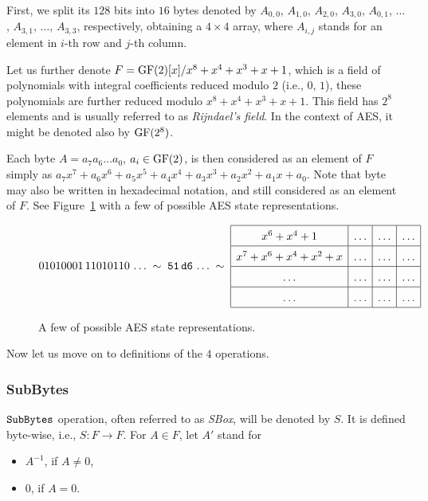 First, we split its $128$ bits into $16$ bytes denoted by $A_{0,0}$, $A_{1,0}$, $A_{2,0}$, $A_{3,0}$, $A_{0,1}$, $\ldots$, $A_{3,1}$, $\ldots$, $A_{3,3}$, respectively, obtaining a $4\times 4$ array, where $A_{i,j}$ stands for an element in $i$-th row and $j$-th column.

Let us further denote $F = \mathrm{GF}(2)[x]/x^8+x^4+x^3+x+1$, which is a field of polynomials with integral coefficients reduced modulo $2$ (i.e., $0$, $1$), these polynomials are further reduced modulo $x^8+x^4+x^3+x+1$. This field has $2^8$ elements and is usually referred to as {\em Rijndael's field}. In the context of AES, it might be denoted also by $\mathrm{GF}(2^8)$.


Each byte $A = a_7a_6\ldots a_0$, $a_i\in\mathrm{GF}(2)$, is then considered as an element of $F$ simply as $a_7x^7 + a_6x^6 + a_5x^5 + a_4x^4 + a_3x^3 + a_2x^2 + a_1x + a_0$.  Note that byte may also be written in hexadecimal notation, and still considered as an element of $F$. See Figure~\ref{fig:aesnot} with a few of possible AES state representations.

\begin{figure}[H]
\[
\arraycolsep=.5em\def\arraystretch{1.5}
	01010001\,11010110\,\ldots\;\sim\;\texttt{51}\,\texttt{d6}\,\ldots\;\sim\;
	\begin{array}{|c|c|c|c|}
		\hline
		x^6 + x^4 + 1 & \ldots & \ldots & \ldots \\
		\hline
		x^7 + x^6 + x^4 + x^2 + x & \ldots & \ldots & \ldots \\
		\hline
		\ldots & \ldots & \ldots & \ldots \\
		\hline
		\ldots & \ldots & \ldots & \ldots \\
		\hline
	\end{array}
\]
\caption{A few of possible AES state representations.}
\label{fig:aesnot}
\end{figure}

\noindent
Now let us move on to definitions of the $4$ operations.

\subsubsection{SubBytes}
	
	$\texttt{SubBytes}$ operation, often referred to as {\em SBox}, will be denoted by $S$. It is defined byte-wise, i.e., $S: F \rightarrow F$. For $A\in F$, let $A'$ stand for
	\begin{itemize}
		\item $A^{-1}$, if $A \neq 0$,
		\item $0$, if $A = 0$.
	\end{itemize}
	
